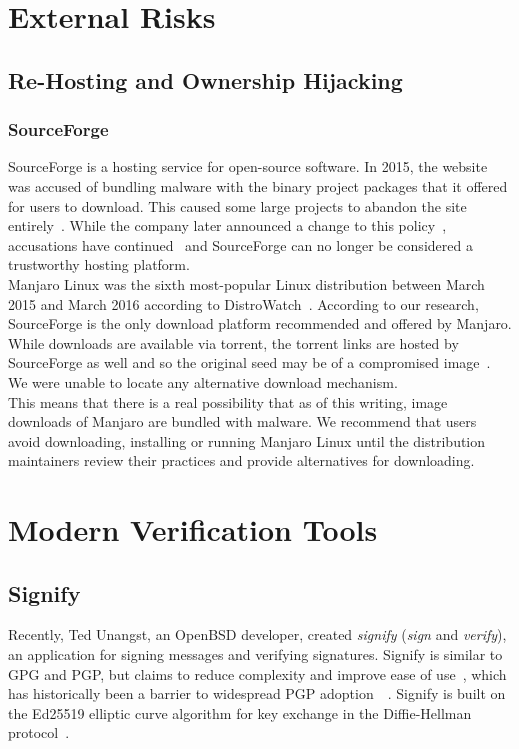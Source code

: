 \documentclass[conference]{IEEEtran}
\begin{document}
\section{External Risks}

\subsection{Re-Hosting and Ownership Hijacking}

\subsubsection{SourceForge}

SourceForge is a hosting service for open-source software. In 2015, the
website was accused of bundling malware with the binary project packages
that it offered for users to download. This caused some large projects to
abandon the site entirely~\cite{GIMPSourceForge}. While the company later
announced a change to this policy~\cite{SourceForgePolicy}, accusations
have continued~\cite{NmapSourceForge} and SourceForge can no longer be considered
a trustworthy hosting platform.\\
\indent Manjaro Linux was the sixth most-popular Linux distribution between March 2015
and March 2016 according to DistroWatch~\cite{DistroWatch}. According to our research,
SourceForge is the only download platform recommended and offered by
Manjaro. While downloads are available via torrent, the torrent
links are hosted by SourceForge as well and so the original seed may be of a compromised
image~\cite{ManjaroDownload}. We were unable to locate any alternative download mechanism.\\
\indent This means that there is a real possibility that as of this writing, image downloads
of Manjaro are bundled with malware. We recommend that users avoid downloading, installing
or running Manjaro Linux until the distribution maintainers review their practices and
provide alternatives for downloading.

\section{Modern Verification Tools}

\subsection{Signify\label{signify}}

Recently, Ted Unangst, an OpenBSD developer, created \emph{signify} (\emph{sign} and
\emph{verify}), an application for signing messages and verifying signatures. Signify is
similar to GPG and PGP, but claims to reduce complexity and improve ease of use~\cite{signify},
which has historically been a barrier to widespread PGP adoption~\cite{whitten1999johnny}~\cite{sheng2006johnny}.
Signify is built on the Ed25519 elliptic curve algorithm for key exchange in the
Diffie-Hellman protocol~\cite{signify}.
\end{document}
